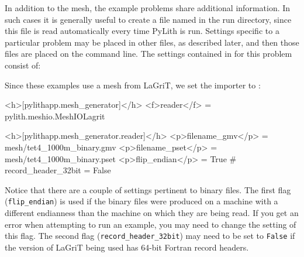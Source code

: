 In addition to the mesh, the example problems share additional information.
In such cases it is generally useful to create a file named 
in the run directory, since this file is read automatically every
time PyLith is run. Settings specific to a particular problem may
be placed in other  files, as described later, and then
those files are placed on the command line.  The settings contained
in  for this problem consist of:
\begin{inventory}
\end{inventory}
Since these examples use a mesh from LaGriT, we set the importer to
:
\begin{cfg}
<h>[pylithapp.mesh_generator]</h>
<f>reader</f> = pylith.meshio.MeshIOLagrit

<h>[pylithapp.mesh_generator.reader]</h>
<p>filename_gmv</p> = mesh/tet4_1000m_binary.gmv
<p>filename_pset</p> = mesh/tet4_1000m_binary.pset
<p>flip_endian</p> = True
# record_header_32bit = False
\end{cfg}
Notice that there are a couple of settings pertinent to binary files.
The first flag (\texttt{flip\_endian}) is used if the binary files
were produced on a machine with a different endianness than the machine
on which they are being read. If you get an error when attempting
to run an example, you may need to change the setting of this flag.
The second flag (\texttt{record\_header\_32bit}) may need to be set
to \texttt{False} if the version of LaGriT being used has 64-bit Fortran
record headers. 

